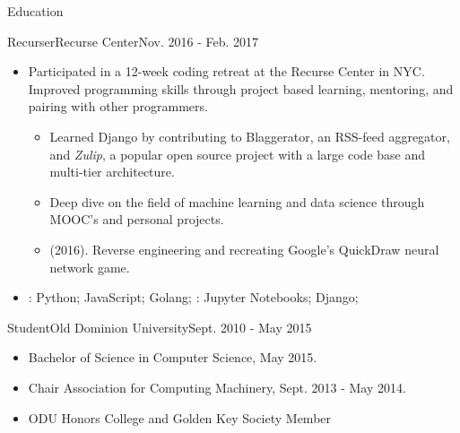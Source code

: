 \documentclass[]{mcdowellcv}
\begin{document}
    \begin{cvsection}{Education}
        \begin{cvsubsection}{Recurser}{Recurse Center}{Nov. 2016 - Feb. 2017}
            \begin{itemize}
                \item Participated in a 12-week coding retreat at the Recurse Center in NYC.\newline 
                Improved programming skills through project based learning, mentoring, and pairing with other programmers.
                \begin{itemize}
                    \item Learned Django by contributing to Blaggerator, an RSS-feed aggregator, and \textit{Zulip}, a popular open source project with a large code base and multi-tier architecture.
                    \item Deep dive on the field of machine learning and data science through MOOC's and personal projects.
                    \item {} (2016). Reverse engineering and recreating Google's QuickDraw neural network game.
                \end{itemize}
            \end{itemize}
            \begin{itemize}
                 \item {}: Python; JavaScript; Golang; : Jupyter Notebooks; Django;
            \end{itemize}
        \end{cvsubsection}
        \begin{cvsubsection}{Student}{Old Dominion University}{Sept. 2010 - May 2015}
            \begin{itemize}
                \item Bachelor of Science in Computer Science, May 2015.
                \item Chair Association for Computing Machinery, Sept. 2013 - May 2014.
                \item ODU Honors College and Golden Key Society Member 
            \end{itemize}
        \end{cvsubsection}
    \end{cvsection}
\end{document}
